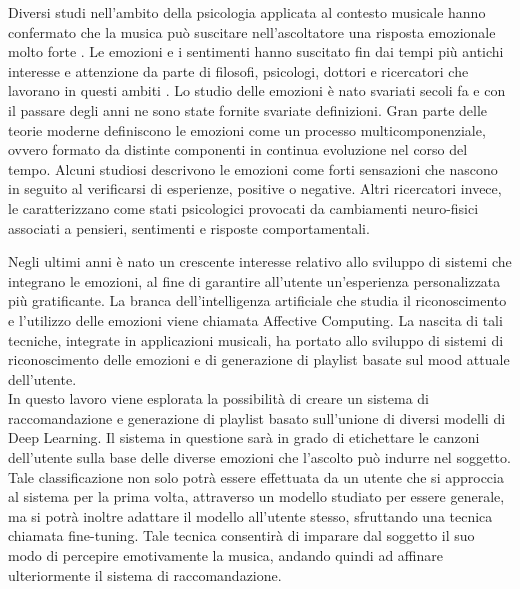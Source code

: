 \documentclass[11pt]{report}
\begin{document}
Diversi studi nell'ambito della psicologia applicata al contesto musicale hanno confermato che la musica può suscitare nell'ascoltatore una risposta emozionale molto forte \cite{Krumhansl}\cite{Mitterschiffthaler2007Nov}\cite{Charlotte}. Le emozioni e i sentimenti hanno suscitato fin dai tempi più antichi interesse e attenzione da parte di filosofi, psicologi, dottori e ricercatori che lavorano in questi ambiti \cite{Barrett2006Mar}. Lo studio delle emozioni è nato svariati secoli fa e con il passare degli anni ne sono state fornite svariate definizioni. Gran parte delle teorie moderne definiscono le emozioni come un processo multicomponenziale, ovvero formato da distinte componenti in continua evoluzione nel corso del tempo. Alcuni studiosi descrivono le emozioni come forti sensazioni che nascono in seguito al verificarsi di esperienze, positive o negative\cite{knuuttila2004emotions}. Altri ricercatori invece, le caratterizzano come stati psicologici provocati da cambiamenti neuro-fisici associati a pensieri, sentimenti e risposte comportamentali\cite{Chaturvedi2022Feb}.

Negli ultimi anni è nato un crescente interesse relativo allo sviluppo di sistemi che integrano le emozioni, al fine di garantire all'utente un'esperienza personalizzata più gratificante. La branca dell'intelligenza artificiale che studia il riconoscimento e l'utilizzo delle emozioni viene chiamata Affective Computing\cite{picard2000affective}. La nascita di tali tecniche, integrate in applicazioni musicali, ha portato allo sviluppo di sistemi di riconoscimento delle emozioni e di generazione di playlist basate sul mood attuale dell'utente.\\

In questo lavoro viene esplorata la possibilità di creare un sistema di raccomandazione e generazione di playlist basato sull'unione di diversi modelli di Deep Learning. Il sistema in questione sarà in grado di etichettare le canzoni dell'utente sulla base delle diverse emozioni che l'ascolto può indurre nel soggetto. Tale classificazione non solo potrà essere effettuata da un utente che si approccia al sistema per la prima volta, attraverso un modello studiato per essere generale, ma si potrà inoltre adattare il modello all'utente stesso, sfruttando una tecnica chiamata fine-tuning. Tale tecnica consentirà di imparare dal soggetto il suo modo di percepire emotivamente la musica, andando quindi ad affinare ulteriormente il sistema di raccomandazione.\\
\end{document}

